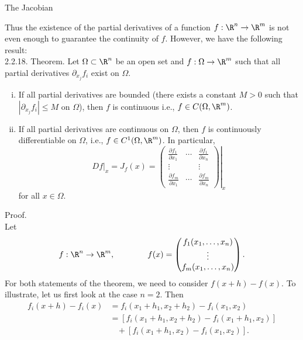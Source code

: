 \documentclass[smaller,hyperref={CJKbookmarks=true}]{beamer}
\begin{document}
\begin{frame}{The Jacobian}
\begin{spacing}{1}
\begin{figure}
\end{figure}
\newpage
\vspace*{6pt}
Thus the existence of the partial derivatives of a function $f:\R^n\to\R^m$ is not even enough to guarantee the continuity of $f$. However, we have the following result:\\[6pt]
\alert{2.2.18. Theorem.} Let $\Omega\subset\R^n$ be an open set and $f:\Omega\to\R^m$ such that all partial derivatives $\partial_{x_j}f_i$ exist on $\Omega$.
\begin{enumerate}[(i)]
  \item If all partial derivatives are bounded (there exists a constant $M>0$ such that $|\partial_{x_j}f_i|\leq M$ on $\Omega$), then $f$ is continuous i.e., $f\in C(\Omega,\R^m)$.
  \item If all partial derivatives are continuous on $\Omega$, then $f$ is continuously dif{}ferentiable on $\Omega$, i.e., $f\in C^1(\Omega,\R^m)$. In particular,
      \[Df|_x=J_f(x)=\left.\begin{pmatrix}
          \frac{\partial f_1}{\partial x_1} & \cdots & \frac{\partial f_1}{\partial x_n} \\
          \vdots &  & \vdots \\
          \frac{\partial f_m}{\partial x_1} & \cdots & \frac{\partial f_m}{\partial x_n}
        \end{pmatrix}\right|_x\]
      for all $x\in\Omega$.
\end{enumerate}
\newpage
\vspace*{17pt}
\alert{Proof.}\\
Let
\[f:\R^n\to\R^m,\qquad\qquad f(x)=\begin{pmatrix}
                                    f_1(x_1,\ldots,x_n) \\
                                    \vdots \\
                                    f_m(x_1,\ldots,x_n)
                                  \end{pmatrix}.\]
For both statements of the theorem, we need to consider $f(x+h)-f(x)$. To illustrate, let us first look at the case $n=2$. Then
\begin{equation*}
  \begin{split}
     f_i(x+h)-f_i(x) &=f_i(x_1+h_1,x_2+h_2)-f_i(x_1,x_2) \\
       &=[f_i(x_1+h_1,x_2+h_2)-f_i(x_1+h_1,x_2)]  \\
       &~~~~+[f_i(x_1+h_1,x_2)-f_i(x_1,x_2)].
  \end{split}
\end{equation*}

\end{spacing}
\end{frame}
\end{document}
